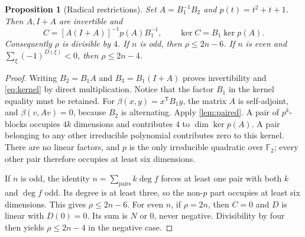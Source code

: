 \documentclass[11pt,a4paper]{article}
\newtheorem{proposition}[theorem]{Proposition}
\theoremstyle{definition}
\theoremstyle{remark}
\numberwithin{equation}{section}
\newcommand{\F}{\mathbb F}
\begin{document}
\begin{proposition}[Radical restrictions]\label{prop:radical}
Set \(A=B_1^{-1}B_2\) and \(p(t)=t^2+t+1\). Then \(A,I+A\) are
invertible and
\begin{equation}\label{eq:kernel}
 C=[A(I+A)]^{-1}p(A)B_1^{-1},\qquad
 \ker C=B_1\ker p(A).
\end{equation}
Consequently \(\rho\) is divisible by \(4\).
If \(n\) is odd, then \(\rho\leq2n-6\).
If \(n\) is even and \(\sum_\xi(-1)^{D(\xi)}<0\), then
\(\rho\leq2n-4\).
\end{proposition}
\begin{proof}
Writing \(B_2=B_1A\) and \(B_3=B_1(I+A)\) proves invertibility and
\eqref{eq:kernel} by direct multiplication.
Notice that the factor \(B_1\) in the kernel equality must be retained.
For \(\beta(x,y)=x^{\mathsf T}B_1y\), the matrix \(A\) is self-adjoint,
and \(\beta(v,Av)=0\), because \(B_2\) is alternating.
Apply \cref{lem:paired}.
A pair of \(p^k\)-blocks occupies \(4k\) dimensions and contributes
\(4\) to \(\dim\ker p(A)\). A pair belonging to any other irreducible
polynomial contributes zero to this kernel.
There are no linear factors, and \(p\) is the only irreducible
quadratic over \(\F_2\); every other pair therefore occupies at least
six dimensions.

If \(n\) is odd, the identity
\(n=\sum_{\text{pairs}}k\deg f\) forces at least one pair with both
\(k\) and \(\deg f\) odd. Its degree is at least three, so the
non-\(p\) part occupies at least six dimensions.
This gives \(\rho\leq2n-6\).
For even \(n\), if \(\rho=2n\), then \(C=0\) and \(D\) is linear
with \(D(0)=0\). Its sum is \(N\) or \(0\), never negative.
Divisibility by four then yields \(\rho\leq2n-4\) in the negative case.
\end{proof}
\end{document}
